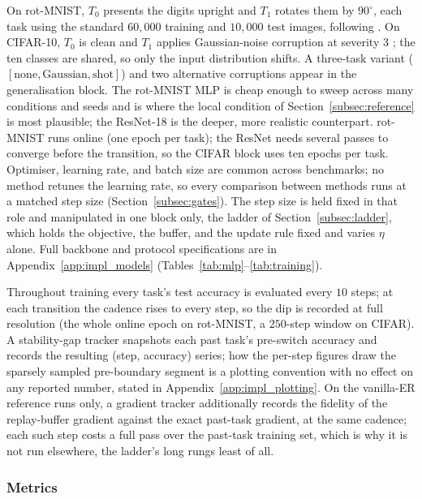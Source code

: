 On rot-MNIST, $T_0$ presents the digits upright and $T_1$ rotates them by $90^\circ$, each task using the standard $60{,}000$ training and $10{,}000$ test images, following \citet{delange2023continualevaluationlifelonglearning}. On CIFAR-10, $T_0$ is clean and $T_1$ applies Gaussian-noise corruption at severity $3$ \citep{hendrycks2019robustness}; the ten classes are shared, so only the input distribution shifts. A three-task variant ($[\text{none}, \text{Gaussian}, \text{shot}]$) and two alternative corruptions appear in the generalisation block. The rot-MNIST MLP is cheap enough to sweep across many conditions and seeds and is where the local condition of Section~\ref{subsec:reference} is most plausible; the ResNet-18 is the deeper, more realistic counterpart. rot-MNIST runs online (one epoch per task); the ResNet needs several passes to converge before the transition, so the CIFAR block uses ten epochs per task. Optimiser, learning rate, and batch size are common across benchmarks; no method retunes the learning rate, so every comparison between methods runs at a matched step size (Section~\ref{subsec:gates}). The step size is held fixed in that role and manipulated in one block only, the ladder of Section~\ref{subsec:ladder}, which holds the objective, the buffer, and the update rule fixed and varies $\eta$ alone. Full backbone and protocol specifications are in Appendix~\ref{app:impl_models} (Tables~\ref{tab:mlp}--\ref{tab:training}).

Throughout training every task's test accuracy is evaluated every $10$ steps; at each transition the cadence rises to every step, so the dip is recorded at full resolution (the whole online epoch on rot-MNIST, a $250$-step window on CIFAR). A stability-gap tracker snapshots each past task's pre-switch accuracy and records the resulting (step, accuracy) series; how the per-step figures draw the sparsely sampled pre-boundary segment is a plotting convention with no effect on any reported number, stated in Appendix~\ref{app:impl_plotting}. On the vanilla-ER reference runs only, a gradient tracker additionally records the fidelity of the replay-buffer gradient against the exact past-task gradient, at the same cadence; each such step costs a full pass over the past-task training set, which is why it is not run elsewhere, the ladder's long rungs least of all.

\subsubsection{Metrics}
\label{subsec:metrics}

